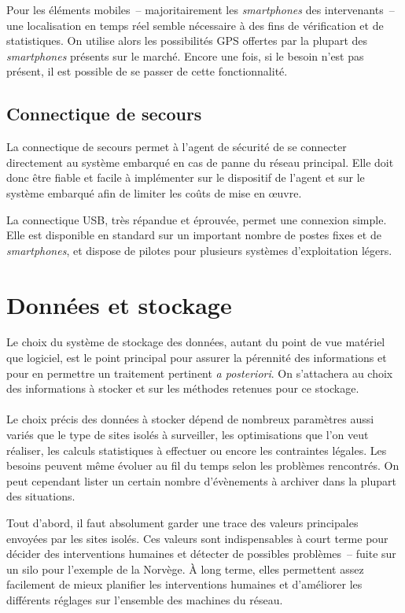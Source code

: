 \documentclass[a4paper, 11pt, final]{article}
\begin{document}
Pour les éléments mobiles~-- majoritairement les \emph{smartphones}
des intervenants~-- une localisation en temps réel semble nécessaire à
des fins de vérification et de statistiques. On utilise alors les
possibilités GPS offertes par la plupart des \emph{smartphones}
présents sur le marché. Encore une fois, si le besoin n'est pas
présent, il est possible de se passer de cette fonctionnalité.

\subsection{Connectique de secours}
La connectique de secours permet à l'agent de sécurité de se connecter
directement au système embarqué en cas de panne du réseau
principal. Elle doit donc être fiable et facile à implémenter sur le
dispositif de l'agent et sur le système embarqué afin de limiter les
coûts de mise en œuvre.

La connectique USB, très répandue et éprouvée, permet une connexion
simple. Elle est disponible en standard sur un important nombre de
postes fixes et de \emph{smartphones}, et dispose de pilotes pour
plusieurs systèmes d'exploitation légers.


\section{Données et stockage}
Le choix du système de stockage des données, autant du point de vue
matériel que logiciel, est le point principal pour assurer la
pérennité des informations et pour en permettre un traitement
pertinent \emph{a posteriori}. On s'attachera au choix des
informations à stocker et sur les méthodes retenues pour ce stockage.

\paragraph{}
Le choix précis des données à stocker dépend de nombreux paramètres
aussi variés que le type de sites isolés à surveiller, les
optimisations que l'on veut réaliser, les calculs statistiques à
effectuer ou encore les contraintes légales. Les besoins peuvent même
évoluer au fil du temps selon les problèmes rencontrés. On peut
cependant lister un certain nombre d'évènements à archiver dans la
plupart des situations.

Tout d'abord, il faut absolument garder une trace des valeurs
principales envoyées par les sites isolés. Ces valeurs sont
indispensables à court terme pour décider des interventions humaines
et détecter de possibles problèmes~-- fuite sur un silo pour l'exemple
de la Norvège. À long terme, elles permettent assez facilement de mieux
planifier les interventions humaines et d'améliorer les différents
réglages sur l'ensemble des machines du réseau.
\end{document}
